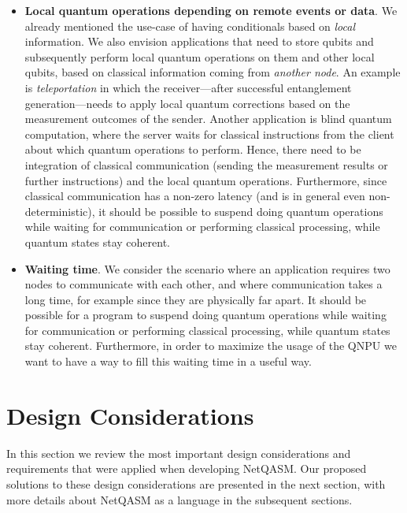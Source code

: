 \begin{itemize}
      \item \textbf{Local quantum operations depending on remote events or data}.
            We already mentioned the use-case of having conditionals based on \emph{local} information.
            We also envision applications that need to store qubits and subsequently perform local quantum operations on them and other local qubits, based on classical information coming from \textit{another node}.
            An example is \textit{teleportation} in which the receiver---after successful entanglement generation---needs to apply local quantum corrections based on the measurement outcomes of the sender.
            Another application is blind quantum computation, where the server waits for classical instructions from the client about which quantum operations to perform.
            Hence, there need to be integration of classical communication (sending the measurement results or further instructions) and the local quantum operations.
            Furthermore, since classical communication has a non-zero latency (and is in general even non-deterministic), it should be possible to suspend doing quantum operations while waiting for communication or performing classical processing, while quantum states stay coherent.


      \item \textbf{Waiting time}.
            We consider the scenario where an application requires two nodes to communicate with each other, and where communication takes a long time, for example since they are physically far apart.
            It should be possible for a program to suspend doing quantum operations while waiting for communication or performing classical processing, while quantum states stay coherent.
            Furthermore, in order to maximize the usage of the \ac{QNPU} we want to have a way to fill this waiting time in a useful way.
\end{itemize}


\section{Design Considerations}
\label{sec:design_considerations}
In this section we review the most important design considerations and requirements that were applied when
developing \ac{NetQASM}.
Our proposed solutions to these design considerations are presented in the next section, with more details about \ac{NetQASM} as a language
in the subsequent sections.

